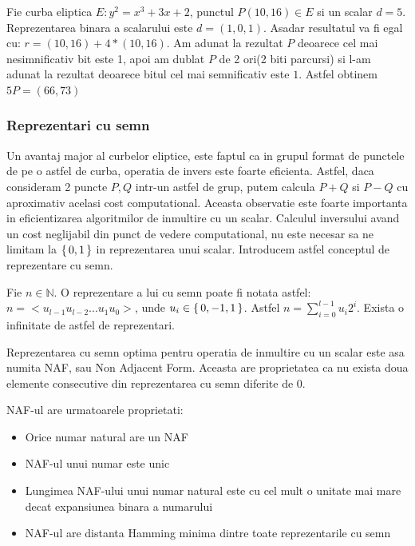 \begin{ex}
Fie curba eliptica $E: y^2 = x^3 + 3x + 2$, punctul $P(10, 16)\in E$ si un scalar $d = 5$. Reprezentarea binara a scalarului este $d = (1, 0, 1)$. Asadar resultatul va fi egal cu: $r = (10, 16) + 4*(10, 16)$. Am adunat la rezultat $P$ deoarece cel mai nesimnificativ bit este 1, apoi am dublat $P$ de 2 ori(2 biti parcursi) si l-am adunat la rezultat deoarece bitul cel mai semnificativ este $1$. Astfel obtinem $5P = (66, 73)$
\end{ex}

\subsubsection{Reprezentari cu semn}

Un avantaj major al curbelor eliptice, este faptul ca in grupul format de punctele de pe o astfel de curba, operatia de invers este foarte eficienta. Astfel, daca consideram 2 puncte $P, Q$ intr-un astfel de grup, putem calcula $P + Q$ si $P - Q$ cu aproximativ acelasi cost computational. Aceasta observatie este foarte importanta in eficientizarea algoritmilor de inmultire cu un scalar. Calculul inversului avand un cost neglijabil din punct de vedere computational, nu este necesar sa ne limitam la $\set{0, 1}$ in reprezentarea unui scalar. Introducem astfel conceptul de reprezentare cu semn.

\begin{dfn}
 Fie $n\in\mathbb{N}$. O reprezentare a lui cu semn poate fi notata astfel: $n = <u_{l-1}u_{l-2}...u_1u_0>$, unde $u_i\in\set{0, -1, 1}$. Astfel $n = \sum_{i=0}^{l-1} u_i 2^{i}$. Exista o infinitate de astfel de reprezentari.
\end{dfn}
\begin{dfn}
Reprezentarea cu semn optima pentru operatia de inmultire cu un scalar este asa numita NAF, sau Non Adjacent Form. Aceasta are proprietatea ca nu exista doua elemente consecutive din reprezentarea cu semn diferite de 0.
\end{dfn}

\begin{teo}
NAF-ul are urmatoarele proprietati:
\begin{itemize}
  \item Orice numar natural are un NAF
  \item NAF-ul unui numar este unic
  \item Lungimea NAF-ului unui numar natural este cu cel mult o unitate mai mare decat expansiunea binara a numarului 
  \item NAF-ul are distanta Hamming minima dintre toate reprezentarile cu semn
\end{itemize}
\end{teo}

